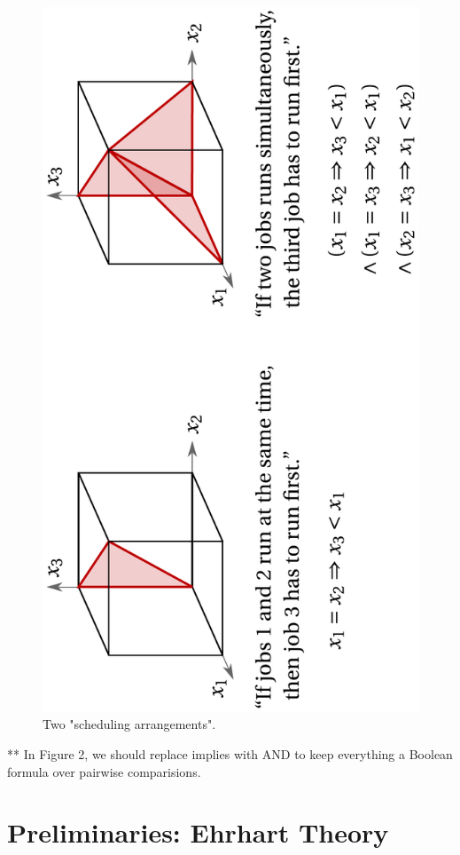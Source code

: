 \documentclass[12pt]{amsart}
\begin{document}
\begin{figure}[h]
\includegraphics[width=13cm]{schedule}
\caption{Two "scheduling arrangements".}
\end{figure}

** In Figure 2, we should replace implies with AND to keep everything a Boolean formula over pairwise comparisions. 

\section{Preliminaries: Ehrhart Theory}
\end{document}
